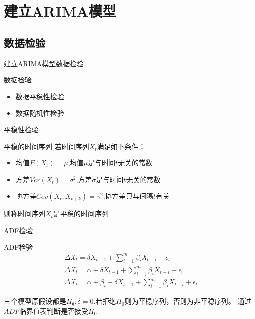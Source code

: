 \documentclass[10pt]{beamer}
\begin{document}
\section{建立ARIMA模型}
\subsection{数据检验}
\begin{frame}{建立ARIMA模型}{数据检验}


\begin{block}{数据检验}
  \begin{itemize}
    \item  数据平稳性检验
    \item  数据随机性检验
  \end{itemize}
\end{block}
\end{frame}

\begin{frame}{平稳性检验}
  \begin{block}{平稳的时间序列}
    若时间序列\(X_t\)满足如下条件：

    \begin{itemize}
      \item 均值\(E ( X_t ) = \mu \),均值\(\mu\)是与时间\(t\)无关的常数
      \item 方差\(Var(X_t) = \sigma^2\),方差\(\sigma\)是与时间\(t\)无关的常数
      \item 协方差\(Cov(X_t,X_{t+k}) = \gamma^2\),协方差只与间隔\(t\)有关  
    \end{itemize}

    则称时间序列\(X_t\)是平稳的时间序列
  \end{block}
\end{frame}
     

\begin{frame}{ADF检验}
  \begin{block}{ADF检验}
    \begin{equation*}
      \begin{aligned}
      &\Delta X_t = \delta X_{t-1} + \sum_{i=1}^{m}\beta_i X_{t-i} + \epsilon_t \\
      &\Delta X_t =\alpha + \delta X_{t-1} + \sum_{i=1}^{m}\beta_i X_{t-i} + \epsilon_t \\
      &\Delta X_t =\alpha +\beta_t+ \delta X_{t-1} + \sum_{i=1}^{m}\beta_i X_{t-i} + \epsilon_t
      \end{aligned}
    \end{equation*}
  \end{block}

  三个模型原假设都是\(H_0 : \delta = 0\).若拒绝\(H_0\)则为平稳序列，否则为非平稳序列。
  通过\(ADF \)临界值表判断是否接受\(H_0\)
\end{frame}
\end{document}
